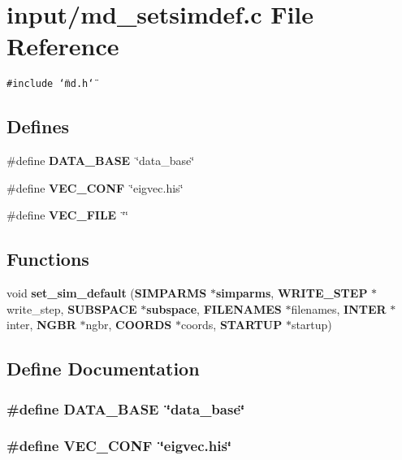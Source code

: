 \section{input/md\_\-setsimdef.c File Reference}
\label{input_2md__setsimdef_8c}
{\tt \#include \char`\"{}md.h\char`\"{}}\par
\subsection*{Defines}
\begin{CompactItemize}
\item 
\#define {\bf DATA\_\-BASE}~\char`\"{}data\_\-base\char`\"{}
\item 
\#define {\bf VEC\_\-CONF}~\char`\"{}eigvec.his\char`\"{}
\item 
\#define {\bf VEC\_\-FILE}~\char`\"{}\char`\"{}
\end{CompactItemize}
\subsection*{Functions}
\begin{CompactItemize}
\item 
void {\bf set\_\-sim\_\-default} ({\bf SIMPARMS} $\ast${\bf simparms}, {\bf WRITE\_\-STEP} $\ast$write\_\-step, {\bf SUBSPACE} $\ast${\bf subspace}, {\bf FILENAMES} $\ast$filenames, {\bf INTER} $\ast$inter, {\bf NGBR} $\ast$ngbr, {\bf COORDS} $\ast$coords, {\bf STARTUP} $\ast$startup)
\end{CompactItemize}


\subsection{Define Documentation}
\subsubsection{\setlength{\rightskip}{0pt plus 5cm}\#define DATA\_\-BASE~\char`\"{}data\_\-base\char`\"{}}\label{input_2md__setsimdef_8c_3c3b59f1ce84cdb39bb6e624512d4e1d}


\subsubsection{\setlength{\rightskip}{0pt plus 5cm}\#define VEC\_\-CONF~\char`\"{}eigvec.his\char`\"{}}\label{input_2md__setsimdef_8c_e42089b70137cfaa830942b973402768}


